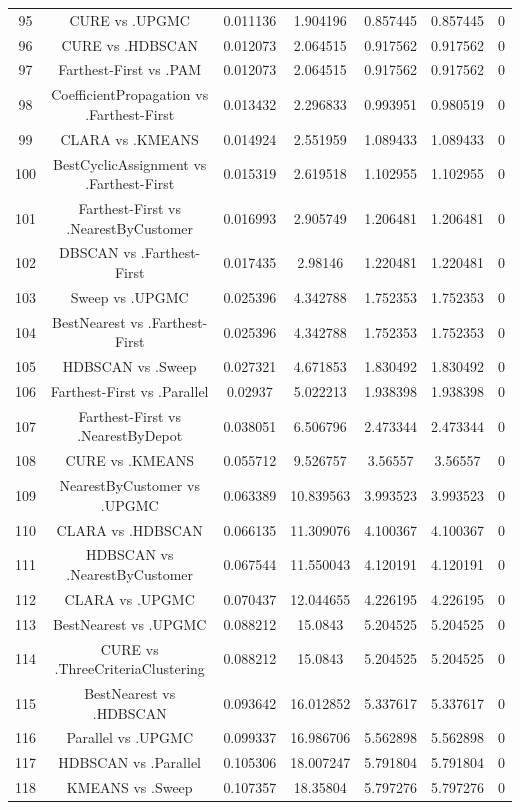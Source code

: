 \documentclass[a4paper,10pt]{article}
\begin{document}
\begin{landscape}
\begin{table}[!htp]
\begin{tabular}{ccccccc}
95&CURE vs .UPGMC&0.011136&1.904196&0.857445&0.857445&0\\
96&CURE vs .HDBSCAN&0.012073&2.064515&0.917562&0.917562&0\\
97&Farthest-First vs .PAM&0.012073&2.064515&0.917562&0.917562&0\\
98&CoefficientPropagation vs .Farthest-First&0.013432&2.296833&0.993951&0.980519&0\\
99&CLARA vs .KMEANS&0.014924&2.551959&1.089433&1.089433&0\\
100&BestCyclicAssignment vs .Farthest-First&0.015319&2.619518&1.102955&1.102955&0\\
101&Farthest-First vs .NearestByCustomer&0.016993&2.905749&1.206481&1.206481&0\\
102&DBSCAN vs .Farthest-First&0.017435&2.98146&1.220481&1.220481&0\\
103&Sweep vs .UPGMC&0.025396&4.342788&1.752353&1.752353&0\\
104&BestNearest vs .Farthest-First&0.025396&4.342788&1.752353&1.752353&0\\
105&HDBSCAN vs .Sweep&0.027321&4.671853&1.830492&1.830492&0\\
106&Farthest-First vs .Parallel&0.02937&5.022213&1.938398&1.938398&0\\
107&Farthest-First vs .NearestByDepot&0.038051&6.506796&2.473344&2.473344&0\\
108&CURE vs .KMEANS&0.055712&9.526757&3.56557&3.56557&0\\
109&NearestByCustomer vs .UPGMC&0.063389&10.839563&3.993523&3.993523&0\\
110&CLARA vs .HDBSCAN&0.066135&11.309076&4.100367&4.100367&0\\
111&HDBSCAN vs .NearestByCustomer&0.067544&11.550043&4.120191&4.120191&0\\
112&CLARA vs .UPGMC&0.070437&12.044655&4.226195&4.226195&0\\
113&BestNearest vs .UPGMC&0.088212&15.0843&5.204525&5.204525&0\\
114&CURE vs .ThreeCriteriaClustering&0.088212&15.0843&5.204525&5.204525&0\\
115&BestNearest vs .HDBSCAN&0.093642&16.012852&5.337617&5.337617&0\\
116&Parallel vs .UPGMC&0.099337&16.986706&5.562898&5.562898&0\\
117&HDBSCAN vs .Parallel&0.105306&18.007247&5.791804&5.791804&0\\
118&KMEANS vs .Sweep&0.107357&18.35804&5.797276&5.797276&0\\

\end{tabular}
\end{table}
\end{landscape}
\end{document}
